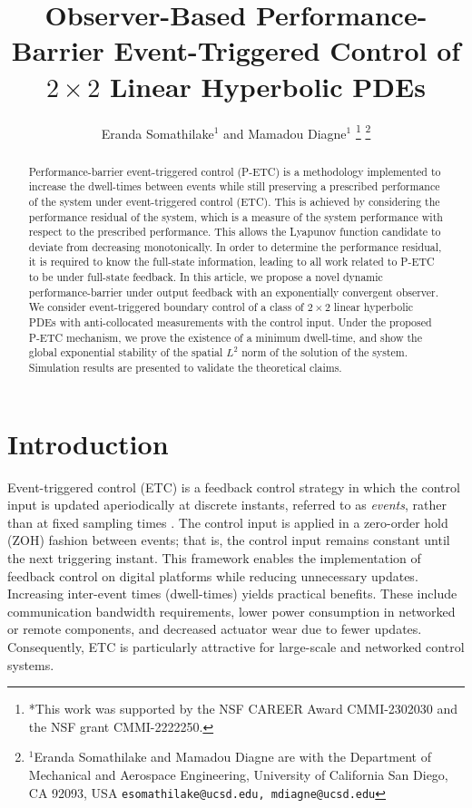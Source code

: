 \documentclass[letterpaper, 10 pt, conference]{ieeeconf}
\title{\LARGE \bf
Observer-Based Performance-Barrier Event-Triggered Control of $2\times2$ Linear Hyperbolic PDEs
}
\author{Eranda Somathilake$^{1}$ and Mamadou Diagne$^{1}$
\thanks{*This work was supported by the NSF CAREER Award CMMI-2302030 and  the NSF grant CMMI-2222250.}
\thanks{$^{1}$Eranda Somathilake and Mamadou Diagne are with the Department of Mechanical and Aerospace Engineering,
        University of California San Diego, CA 92093, USA
        {\tt\small esomathilake@ucsd.edu, mdiagne@ucsd.edu}}%
}
\begin{document}
\maketitle
\thispagestyle{empty}
\pagestyle{empty}
\begin{abstract}
Performance-barrier event-triggered control (P-ETC) is a methodology implemented to increase the dwell-times between events while still preserving a prescribed performance of the system under event-triggered control (ETC). This is achieved by considering the performance residual of the system, which is a measure of the system performance with respect to the prescribed performance. This allows the Lyapunov function candidate to deviate from decreasing monotonically. In order to determine the performance residual, it is required to know the full-state information, leading to all work related to P-ETC to be under full-state feedback. In this article, we propose a novel dynamic performance-barrier under output feedback with an exponentially convergent observer. We consider event-triggered boundary control of a class of $2\times2$ linear hyperbolic PDEs with anti-collocated measurements with the control input. Under the proposed P-ETC mechanism, we prove the existence of a minimum dwell-time, and show the global exponential stability of the spatial $L^2$ norm of the solution of the system. Simulation results are presented to validate the theoretical claims.
\end{abstract}
\section{Introduction}

Event-triggered control (ETC) is a feedback control strategy in which the control input is updated aperiodically at discrete instants, referred to as \textit{events}, rather than at fixed sampling times \cite{tabuada2007event,heemels2012introduction}. The control input is applied in a zero-order hold (ZOH) fashion between events; that is, the control input remains constant until the next triggering instant. This framework enables the implementation of feedback control on digital platforms while reducing unnecessary updates. Increasing inter-event times (dwell-times) yields practical benefits. These include communication bandwidth requirements, lower power consumption in networked or remote components, and decreased actuator wear due to fewer updates. Consequently, ETC is particularly attractive for large-scale and networked control systems. 
\end{document}
